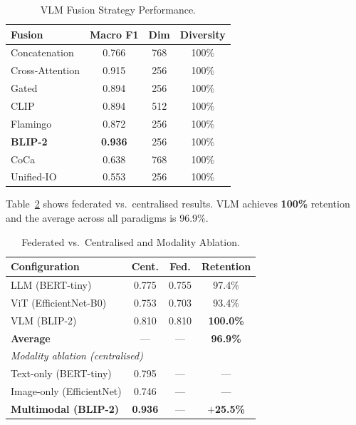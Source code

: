 \documentclass[conference]{IEEEtran}
\begin{document}
\begin{table}[t]
\caption{VLM Fusion Strategy Performance.}
\label{tab:vlmres}
\centering\footnotesize
\setlength\tabcolsep{4pt}
\begin{tabular}{lccc}
\toprule
\textbf{Fusion} & \textbf{Macro F1} & \textbf{Dim} & \textbf{Diversity}\\
\midrule
Concatenation    & 0.766 & 768 & 100\% \\
Cross-Attention  & 0.915 & 256 & 100\% \\
Gated            & 0.894 & 256 & 100\% \\
CLIP             & 0.894 & 512 & 100\% \\
Flamingo         & 0.872 & 256 & 100\% \\
\rowcolor{llmblue!40}
\textbf{BLIP-2}  & \textbf{0.936} & 256 & 100\% \\
CoCa             & 0.638 & 768 & 100\% \\
Unified-IO       & 0.553 & 256 & 100\% \\
\bottomrule
\end{tabular}
\end{table}

Table~\ref{tab:fedcent} shows federated vs.\ centralised results. VLM
achieves \textbf{100\%} retention and the average across all paradigms
is 96.9\%.

\begin{table}[t]
\caption{Federated vs.\ Centralised and Modality Ablation.}
\label{tab:fedcent}
\centering\footnotesize
\setlength\tabcolsep{4pt}
\begin{tabular}{lccc}
\toprule
\textbf{Configuration} & \textbf{Cent.} & \textbf{Fed.} & \textbf{Retention}\\
\midrule
LLM (BERT-tiny)        & 0.775 & 0.755 & 97.4\% \\
ViT (EfficientNet-B0)  & 0.753 & 0.703 & 93.4\% \\
VLM (BLIP-2)           & 0.810 & 0.810 & \textbf{100.0\%} \\
\midrule
\textbf{Average}       & ---   & ---   & \textbf{96.9\%} \\
\midrule
\multicolumn{4}{l}{\textit{Modality ablation (centralised)}}\\
Text-only (BERT-tiny)     & 0.795 & --- & ---\\
Image-only (EfficientNet) & 0.746 & --- & ---\\
\rowcolor{vlmred!30}
\textbf{Multimodal (BLIP-2)} & \textbf{0.936} & --- & \textbf{$+$25.5\%}\\
\bottomrule
\end{tabular}
\end{table}
\end{document}
